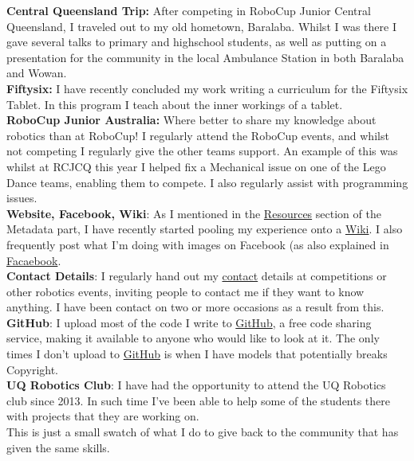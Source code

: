  \textbf{Central Queensland Trip:} After competing in RoboCup Junior Central Queensland, I traveled out to my old hometown, Baralaba. Whilst I was there I gave several  talks to primary and highschool students, as well as putting on a presentation for the community in the local Ambulance Station in both Baralaba and Wowan.\\
  
  \textbf{Fiftysix:}  I have recently concluded my work writing a curriculum for the Fiftysix Tablet. In this program I teach about the inner workings of a tablet.\\
  
  \textbf{RoboCup Junior Australia:} Where better to share my knowledge about robotics than at RoboCup! I regularly attend the RoboCup events, and whilst not competing I regularly give the other teams support. An example of this was whilst at RCJCQ this year I helped fix a Mechanical issue on one of the Lego Dance teams, enabling them to compete. I also regularly assist with programming issues.\\
  
  \textbf{Website, Facebook, Wiki}: As I mentioned in the \hyperref[resources]{Resources} section of the Metadata part, I have recently started pooling my experience onto a \hyperref[subsec:Wiki]{Wiki}. I also frequently post what I'm doing with images on Facebook (as also explained in \hyperref[subsec:Facebook]{Facaebook}.\\
    
  \textbf{Contact Details}: I regularly hand out my \hyperref[contact]{contact} details at competitions or other robotics events, inviting people to contact me if they want to know anything. I have been contact on two or more occasions as a result from this.\\
  
  \textbf{GitHub}: I upload most of the code I write to \hyperref[Git]{GitHub}, a free code sharing service, making it available to anyone who would like to look at it. The only times I don't upload to \hyperref[Git]{GitHub} is when I have models that potentially breaks Copyright.\\
  
  \textbf{UQ Robotics Club}: I have had the opportunity to attend the UQ Robotics club since 2013. In such time I've been able to help some of the students there with projects that they are working on.\\
  
This is just a small swatch of what I do to give back to the community that has given the same skills.\\

